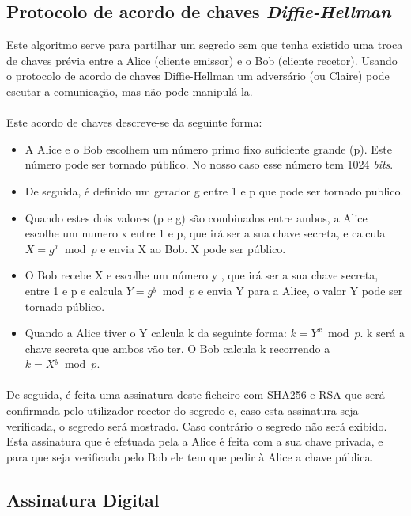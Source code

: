 \subsection{Protocolo de acordo de chaves \textit{Diffie-Hellman}}
Este algoritmo serve para  partilhar um segredo sem que tenha existido uma troca de chaves prévia entre a Alice (cliente emissor) e o Bob (cliente recetor). Usando o protocolo de acordo de chaves Diffie-Hellman um adversário (ou Claire) pode escutar a comunicação, mas não pode manipulá-la.   
\paragraph{}
Este acordo de chaves descreve-se da seguinte forma:
\begin{itemize}
    \item A Alice e o Bob escolhem um número primo fixo suficiente grande (p). Este número  pode ser tornado público. No nosso caso esse número tem 1024 \textit{bits}.
    \item De seguida, é definido um gerador g entre 1 e p que pode ser tornado publico.
    \item Quando estes dois valores (p e g) são combinados entre ambos, a Alice escolhe um numero x entre 1 e p, que irá ser a sua chave secreta, e calcula $X=g^x \bmod p$ e envia X ao Bob. X pode ser público.
    \item O Bob recebe X e  escolhe um número y , que irá ser a sua chave secreta, entre 1 e p e calcula $Y=g^y \bmod p$ e envia Y para a Alice, o valor Y pode ser tornado público.
    \item Quando a Alice tiver o Y calcula k da seguinte forma: $k= Y^x \bmod p$. k será a chave secreta que ambos vão ter. O Bob calcula k recorrendo a $k=X^y\bmod p$.
\end{itemize}
   \paragraph{}
   De seguida, é feita uma assinatura deste ficheiro com SHA256 e RSA que será confirmada pelo utilizador recetor do segredo e, caso esta assinatura seja verificada, o segredo será mostrado. Caso contrário o segredo não será exibido. Esta assinatura que é efetuada pela a Alice é feita com a sua chave privada, e para que seja verificada pelo Bob ele tem que pedir à Alice a chave pública.

\subsection{Assinatura Digital}

